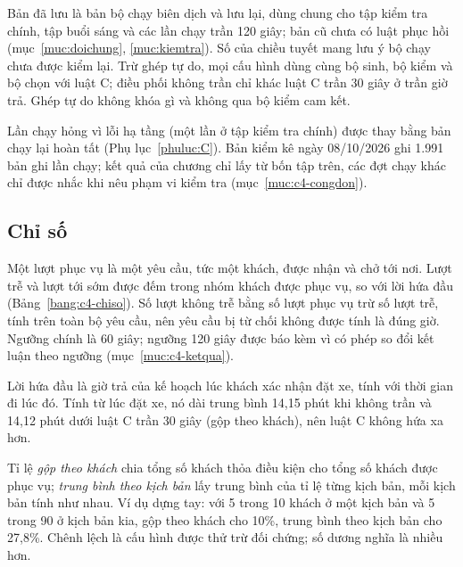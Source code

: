 Bản đã lưu là bản bộ chạy biên dịch và lưu lại, dùng chung cho tập kiểm tra chính, tập buổi sáng và các lần chạy trần
120 giây; bản cũ chưa có luật phục hồi (mục~\ref{muc:doichung}, \ref{muc:kiemtra}). Số của chiều tuyết mang lưu ý bộ
chạy chưa được kiểm lại. Trừ ghép tự do, mọi cấu hình dùng cùng bộ sinh, bộ kiểm và bộ chọn với luật C; điều phối
không trần chỉ khác luật C trần 30 giây ở trần giờ trả. Ghép tự do không khóa gì và không qua bộ kiểm cam kết.

Lần chạy hỏng vì lỗi hạ tầng (một lần ở tập kiểm tra chính) được thay bằng bản chạy lại hoàn tất (Phụ
lục~\ref{phuluc:C}). Bản kiểm kê ngày 08/10/2026 ghi 1.991 bản ghi lần chạy; kết quả của chương chỉ lấy từ bốn tập
trên, các đợt chạy khác chỉ được nhắc khi nêu phạm vi kiểm tra (mục~\ref{muc:c4-congdon}).

\subsection{Chỉ số}
\label{muc:c4-chiso}

Một lượt phục vụ là một yêu cầu, tức một khách, được nhận và chở tới nơi. Lượt trễ và lượt tới sớm được đếm trong nhóm
khách được phục vụ, so với lời hứa đầu (Bảng~\ref{bang:c4-chiso}). Số lượt không trễ bằng số lượt phục vụ trừ số lượt
trễ, tính trên toàn bộ yêu cầu, nên yêu cầu bị từ chối không được tính là đúng giờ. Ngưỡng chính là 60 giây; ngưỡng
120 giây được báo kèm vì có phép so đổi kết luận theo ngưỡng (mục~\ref{muc:c4-ketqua}).

Lời hứa đầu là giờ trả của kế hoạch lúc khách xác nhận đặt xe, tính với thời gian đi lúc đó. Tính từ lúc đặt xe, nó
dài trung bình 14,15 phút khi không trần và 14,12 phút dưới luật C trần 30 giây (gộp theo khách), nên luật C không hứa
xa hơn.

Tỉ lệ \emph{gộp theo khách} chia tổng số khách thỏa điều kiện cho tổng số khách được phục vụ; \emph{trung bình theo
kịch bản} lấy trung bình của tỉ lệ từng kịch bản, mỗi kịch bản tính như nhau. Ví dụ dựng tay: với 5 trong 10 khách ở
một kịch bản và 5 trong 90 ở kịch bản kia, gộp theo khách cho 10\%, trung bình theo kịch bản cho 27,8\%. Chênh lệch là
cấu hình được thử trừ đối chứng; số dương nghĩa là nhiều hơn.

